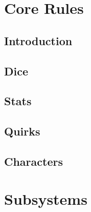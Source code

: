 




    \maketitle

    \afterpage{\blankpage}

    \tableofcontents

    \part{Core Rules}

    \chapter{Introduction}
    

    \chapter{Dice}
    \renewcommand{\hsubtitle}{Change Through Statistics.}
    

    \chapter{Stats}
    \renewcommand{\hsubtitle}{Do I Want to be Better?}
    

    \chapter{Quirks}
    \renewcommand{\hsubtitle}{Do I Want to be Me?}
    
    
    \chapter{Characters}
    \renewcommand{\hsubtitle}{What am I?}
    

    \part{Subsystems}
    \renewcommand{\hsubtitle}{Change Through Purpose.}

